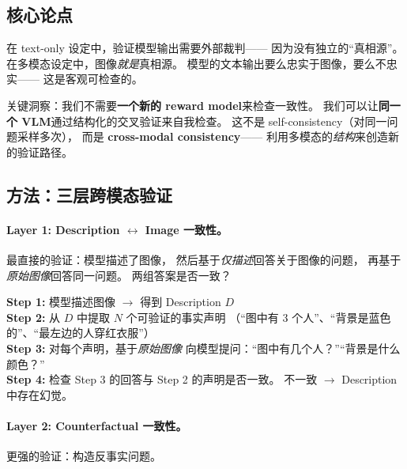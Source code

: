 \documentclass[12pt,a4paper]{article}
\begin{document}
\subsection{核心论点}

\begin{insightbox}
在 text-only 设定中，验证模型输出需要外部裁判——
因为没有独立的``真相源''。
在多模态设定中，图像\textit{就是}真相源。
模型的文本输出要么忠实于图像，要么不忠实——
这是客观可检查的。

关键洞察：我们不需要\textbf{一个新的 reward model}来检查一致性。
我们可以让\textbf{同一个 VLM}通过结构化的交叉验证来自我检查。
这不是 self-consistency（对同一问题采样多次），
而是 \textbf{cross-modal consistency}——
利用多模态的\textit{结构}来创造新的验证路径。
\end{insightbox}

\subsection{方法：三层跨模态验证}

\paragraph{Layer 1: Description $\leftrightarrow$ Image 一致性。}

最直接的验证：模型描述了图像，
然后基于\textit{仅描述}回答关于图像的问题，
再基于\textit{原始图像}回答同一问题。
两组答案是否一致？

\begin{tcolorbox}[colback=gray!5,colframe=gray!50,boxrule=0.3pt,left=4pt,right=4pt]
\small
\textbf{Step 1:} 模型描述图像 $\rightarrow$ 得到 Description $D$\\[2pt]
\textbf{Step 2:} 从 $D$ 中提取 $N$ 个可验证的事实声明
（``图中有 3 个人''、``背景是蓝色的''、``最左边的人穿红衣服''）\\[2pt]
\textbf{Step 3:} 对每个声明，基于\textit{原始图像}
向模型提问：``图中有几个人？''``背景是什么颜色？''\\[2pt]
\textbf{Step 4:} 检查 Step 3 的回答与 Step 2 的声明是否一致。
不一致 $\rightarrow$ Description 中存在幻觉。
\end{tcolorbox}

\paragraph{Layer 2: Counterfactual 一致性。}

更强的验证：构造反事实问题。
\end{document}
